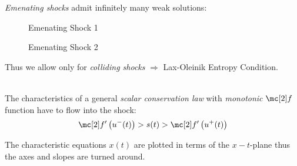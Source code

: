 \begin{sectionbox}[Problem]\nospacing
    \textit{Emenating shocks} admit infinitely many weak solutions:
        \begin{minipage}[t]{0.49\textwidth}
        \vspace{-1em}
          \begin{figure}[H]
              \centering{
                \def\svgwidth{130pt}
                \resizebox{\linewidth}{!}{}
              }
              \vspace{-2em}
              \caption{\scriptsize Emenating Shock 1}
          \end{figure}
        \end{minipage}
        \begin{minipage}[t]{0.49\textwidth}
        \begin{figure}[H]
        \vspace{-1em}
            \centering{
              \def\svgwidth{130pt}
              \resizebox{\linewidth}{!}{}
            }
            \vspace{-2em}
            \caption{\scriptsize Emenating Shock 2}
        \end{figure}
        \end{minipage}
        Thus we allow only for \textit{colliding shocks} $\Rightarrow$ Lax-Oleinik Entropy Condition.
\end{sectionbox}
\begin{propositionbox}\nospacing
    \begin{proposition}\label{proposition:lax_oleinik_entropy_condition}\leavevmode\\
        The characteristics of a general \textit{scalar conservation law} with \textit{monotonic} $\flux$ function have to flow into the shock:
        \begin{align}
          \flux'\left(u^{-}(t)\right)>s(t)>\flux'\left(u^{+}(t)\right)\label{eq:lax_entropy_oleinik_condtion_convex}
        \end{align}
    \end{proposition}
\end{propositionbox}
\begin{attentionbox}
   The characteristic equations $x(t)$ are plotted in terms of the $x-t$-plane thus the axes and slopes are turned around.
\end{attentionbox}
